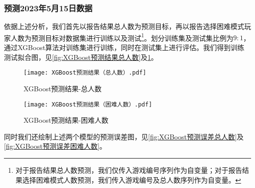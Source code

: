 \documentclass{MathModeling}
\begin{document}
	\subsubsection{预测2023年5月15日数据}
	依据上述分析，我们首先以报告结果总人数为预测目标，再以报告选择困难模式玩家人数为预测目标对数据集进行训练以及测试\textcolor{blue}{\footnote{对于报告结果总人数预测，我们仅传入游戏编号序列作为自变量；对于报告结果选择困难模式人数预测，我们传入游戏编号及总人数序列作为自变量。}}。划分训练集及测试集比例为$9:1$，通过XGBoost算法对训练集进行训练，同时在测试集上进行评估。我们得到训练测试拟合图，见\textcolor{blue}{\cref{fig:XGBoost预测结果总人数}}及\textcolor{blue}{\cref{fig:XGBoost预测结果困难人数}}。

	\begin{figure}[H]
		\centering
		\begin{minipage}{0.48\linewidth}
			\centering
			\texttt{[image: XGBoost预测结果（总人数）.pdf]}
			\caption{XGBoost预测结果-总人数}
			\label{fig:XGBoost预测结果总人数}
		\end{minipage}
		\begin{minipage}{0.48\linewidth}
			\centering
			\texttt{[image: XGBoost预测结果（困难人数）.pdf]}
			\caption{XGBoost预测结果-困难人数}
			\label{fig:XGBoost预测结果困难人数}
		\end{minipage}
	\end{figure}
	同时我们还绘制上述两个模型的预测误差图，见\textcolor{blue}{\cref{fig:XGBoost预测误差总人数}}及\textcolor{blue}{\cref{fig:XGBoost预测误差困难人数}}。
\end{document}

